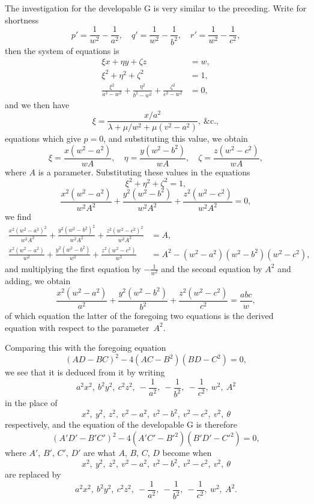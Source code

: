 \documentclass[12pt,a4paper]{article}
\theoremstyle{definition}
\begin{document}
The investigation for the developable G is very similar to the preceding. Write for
shortness
\[
p' = \frac{1}{w^{2}} - \frac{1}{a^{2}},\quad
q' = \frac{1}{w^{2}} - \frac{1}{b^{2}},\quad
r' = \frac{1}{w^{2}} - \frac{1}{c^{2}},
\]
then the system of equations is
\begin{align*}
\xi x + \eta y + \zeta z &= w,\\
\xi^{2} + \eta^{2} + \zeta^{2} &= 1,\\
\frac{\xi^{2}}{a^{2} - w^{2}} + \frac{\eta^{2}}{b^{2} - w^{2}} + \frac{\zeta^{2}}{c^{2} - w^{2}} &= 0,
\end{align*}
and we then have
\[
\xi = \frac{x/a^{2}}{\lambda + \mu/w^{2} + \mu(v^{2} - a^{2})},\ \&\mathrm{c}.,
\]
equations which give $p = 0$, and substituting this value, we obtain
\[
\xi = \frac{x(w^{2} - a^{2})}{wA},\quad
\eta = \frac{y(w^{2} - b^{2})}{wA},\quad
\zeta = \frac{z(w^{2} - c^{2})}{wA},
\]
where $A$ is a parameter. Substituting these values in the equations
\[
\xi^{2} + \eta^{2} + \zeta^{2} = 1,
\]
\[
\frac{x^{2}(w^{2} - a^{2})}{w^{2}A^{2}} + \frac{y^{2}(w^{2} - b^{2})}{w^{2}A^{2}}
+ \frac{z^{2}(w^{2} - c^{2})}{w^{2}A^{2}} = 0,
\]
we find
\begin{align*}
\frac{x^{2}(w^{2} - a^{2})^{2}}{w^{2}A^{2}} + \frac{y^{2}(w^{2} - b^{2})^{2}}{w^{2}A^{2}}
+ \frac{z^{2}(w^{2} - c^{2})^{2}}{w^{2}A^{2}} &= A,\\
\frac{x^{2}(w^{2} - a^{2})}{w^{2}} + \frac{y^{2}(w^{2} - b^{2})}{w^{2}}
+ \frac{z^{2}(w^{2} - c^{2})}{w^{2}} &= A^{2} - (w^{2} - a^{2})(w^{2} - b^{2})(w^{2} - c^{2}),
\end{align*}
and multiplying the first equation by $-\frac{1}{w^{2}}$ and the second equation by $A^{2}$ and adding,
we obtain
\[
\frac{x^{2}(w^{2} - a^{2})}{a^{2}} + \frac{y^{2}(w^{2} - b^{2})}{b^{2}}
+ \frac{z^{2}(w^{2} - c^{2})}{c^{2}} = \frac{abc}{w},
\]
of which equation the latter of the foregoing two equations is the derived equation
with respect to the parameter~$A^{2}$.

Comparing this with the foregoing equation
\[
(AD - BC)^{2} - 4(AC - B^{2})(BD - C^{2}) = 0,
\]
we see that it is deduced from it by writing
\[
a^{2}x^{2},\ b^{2}y^{2},\ c^{2}z^{2},\ -\frac{1}{a^{2}},\ -\frac{1}{b^{2}},\ -\frac{1}{c^{2}},\ w^{2},\ A^{2}
\]
in the place of
\[
x^{2},\ y^{2},\ z^{2},\ v^{2} - a^{2},\ v^{2} - b^{2},\ v^{2} - c^{2},\ v^{2},\ \theta
\]
respectively, and the equation of the developable G is therefore
\[
(A'D' - B'C')^{2} - 4(A'C' - B'^{2})(B'D' - C'^{2}) = 0,
\]
where $A'$, $B'$, $C'$, $D'$ are what $A$, $B$, $C$, $D$ become when
\[
x^{2},\ y^{2},\ z^{2},\ v^{2} - a^{2},\ v^{2} - b^{2},\ v^{2} - c^{2},\ v^{2},\ \theta
\]
are replaced by
\[
a^{2}x^{2},\ b^{2}y^{2},\ c^{2}z^{2},\ -\frac{1}{a^{2}},\ -\frac{1}{b^{2}},\ -\frac{1}{c^{2}},\ w^{2},\ A^{2}.
\]
\end{document}
